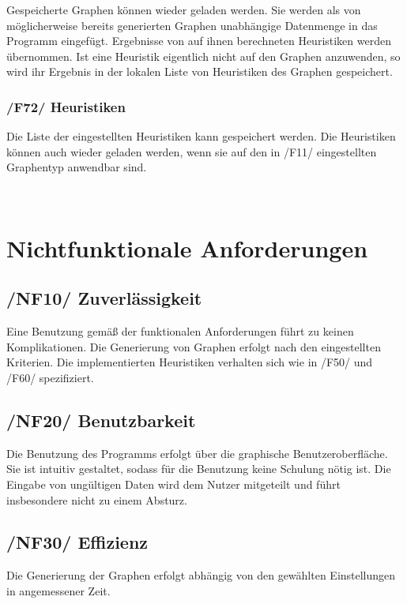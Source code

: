 \documentclass{article}
\begin{document}
	Gespeicherte Graphen können wieder geladen werden. Sie werden als von möglicherweise bereits generierten Graphen unabhängige Datenmenge in das Programm eingefügt. Ergebnisse von auf ihnen berechneten Heuristiken werden übernommen. Ist eine Heuristik eigentlich nicht auf den Graphen anzuwenden, so wird ihr Ergebnis in der lokalen Liste von Heuristiken des Graphen gespeichert.
		
	\subsubsection*{/F72/ Heuristiken} \label{f72} 
	Die Liste der eingestellten Heuristiken kann gespeichert werden. Die Heuristiken können auch wieder geladen werden, wenn sie auf den in /F11/ eingestellten Graphentyp anwendbar sind.
	
	~\newpage
	\section{Nichtfunktionale Anforderungen}
	\subsection*{/NF10/ Zuverlässigkeit} \label{nf10} 
	Eine Benutzung gemäß der funktionalen Anforderungen führt zu keinen Komplikationen. Die Generierung von Graphen erfolgt nach den eingestellten Kriterien. Die implementierten Heuristiken verhalten sich wie in /F50/ und /F60/ spezifiziert.
	
	\subsection*{/NF20/ Benutzbarkeit} \label{nf20} 
	Die Benutzung des Programms erfolgt über die graphische Benutzeroberfläche. Sie ist intuitiv gestaltet, sodass für die Benutzung keine Schulung nötig ist. Die Eingabe von ungültigen Daten wird dem Nutzer mitgeteilt und führt insbesondere nicht zu einem Absturz.
	
	\subsection*{/NF30/ Effizienz} \label{nf30} 
	Die Generierung der Graphen erfolgt abhängig von den gewählten Einstellungen in angemessener Zeit.
	
\end{document}

